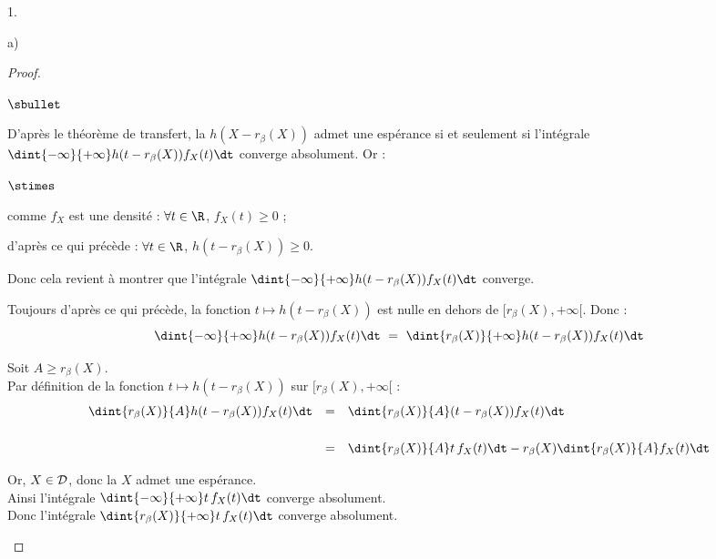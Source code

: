 \begin{noliste}{1.}
\begin{noliste}{a)}
\begin{proof}
\begin{noliste}{$\sbullet$}
    \item D'après le théorème de transfert, la \var $h(X- r_\beta(X))$
      admet une espérance si et seulement si l'intégrale
      $\dint{-\infty}{+\infty} h(t- r_\beta(X)) f_X(t) \dt$ converge
      absolument. Or :
	\begin{noliste}{$\stimes$}
	  \item comme $f_X$ est une densité : $\forall t\in \R$, 
	  $f_X(t) \geq 0$ ;
	  \item d'après ce qui précède : $\forall t \in \R$, 
	  $h(t- r_\beta(X)) \geq 0$.
	\end{noliste}
	Donc cela revient à montrer que l'intégrale $\dint{-\infty}
	{+\infty} h(t-r_\beta(X)) f_X(t) \dt$ converge.
	
	\item Toujours d'après ce qui précède, la fonction $t \mapsto 
	h(t-r_\beta(X))$ est nulle en dehors de $[r_\beta(X), 
	+\infty[$. Donc :
	\[
	  \dint{-\infty}{+\infty} h(t-r_\beta(X)) f_X(t) \dt \ = \
	  \dint{r_\beta(X)}{+\infty} h(t-r_\beta(X)) f_X(t) \dt
	\]
	
	
	
	\newpage
	
	
	\item Soit $A \geq r_\beta(X)$.\\
	Par définition de la fonction $t\mapsto h(t- r_\beta(X))$ 
	sur $[r_\beta(X), +\infty[$ :
	\[
	  \begin{array}{rcl}
	    \dint{r_\beta(X)}{A} h(t-r_\beta(X)) f_X(t) \dt &=& 
	    \dint{r_\beta(X)}{A} (t-r_\beta(X)) f_X(t) \dt
	    \\[.6cm]
	    &=& \dint{r_\beta(X)}{A} t \, f_X(t) \dt - 
	    r_\beta(X) \dint{r_\beta(X)}{A} f_X(t) \dt
	  \end{array}
	\]
	
	\item Or, $X\in {\cal D}$, donc la \var $X$ admet une 
	espérance.\\[.1cm]
	Ainsi l'intégrale $\dint{-\infty}{+\infty} t \, f_X(t) \dt$
	converge absolument.\\[.1cm]
	Donc l'intégrale $\dint{r_\beta(X)}{+\infty} t\, f_X(t) \dt$
	converge absolument.
	

\end{noliste}
\end{proof}
\end{noliste}
\end{noliste}
